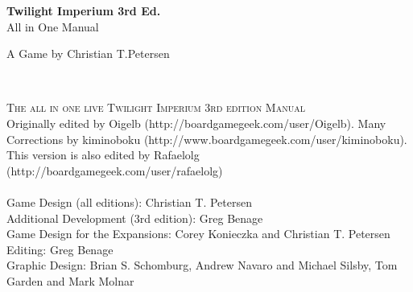 \documentclass[11pt,fleqn]{book} %
\begin{document}

\begingroup
\thispagestyle{empty}
\centering
\vspace*{5cm}
\par\normalfont\fontsize{35}{35}\sffamily\selectfont
\textbf{Twilight Imperium 3rd Ed.}\\
{\LARGE All in One Manual}\par %
\vspace*{1cm}
{\Huge A Game by Christian T.Petersen}\par %
\endgroup


\newpage
~\vfill
\thispagestyle{empty}


\noindent \textsc{The all in one live Twilight Imperium 3rd edition Manual}\\




\noindent Originally edited by Oigelb (http://boardgamegeek.com/user/Oigelb).
Many Corrections by kiminoboku (http://www.boardgamegeek.com/user/kiminoboku).\\ 
This version is also edited by Rafaelolg (http://boardgamegeek.com/user/rafaelolg)\\
\\

\noindent Game Design (all editions): Christian T. Petersen\\
Additional Development (3rd edition): Greg Benage\\
Game Design for the Expansions: Corey Konieczka and Christian T. Petersen\\
Editing: Greg Benage\\
Graphic Design: Brian S. Schomburg, Andrew Navaro and Michael Silsby, Tom Garden and Mark Molnar\\
\end{document}
